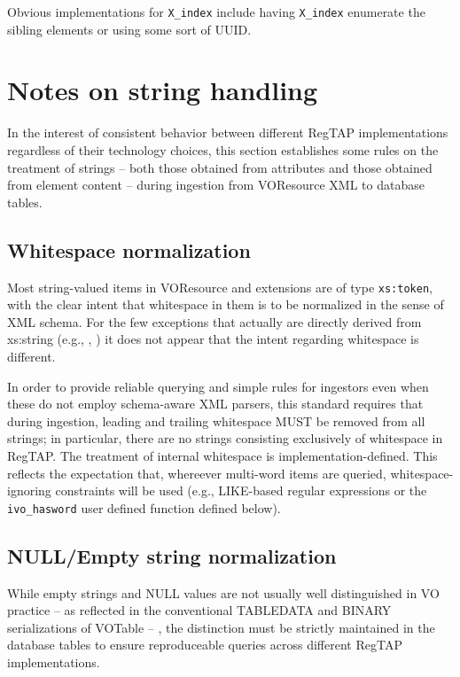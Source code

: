 \documentclass[11pt,a4paper]{ivoa}
\newcommand{\rtent}[1]{\texttt{\color{rtcolor} #1}}
\begin{document}
Obvious implementations for \texttt{X\_index} include having
\texttt{X\_index} enumerate the sibling elements or using some sort
of UUID.


\section{Notes on string handling}

\label{stringnorm}

In the interest of consistent behavior between different RegTAP
implementations regardless of their technology choices, this section
establishes some rules on the treatment of strings -- both those
obtained from attributes and those obtained from element
content -- during ingestion from VOResource XML to database
tables.



\subsection{Whitespace normalization}

\label{whitenorm}

Most string-valued items in VOResource and extensions are of type
\texttt{xs:to\-ken}, with the clear intent that whitespace in them is
to be normalized in the sense of XML schema.  For the few exceptions
that actually are directly derived from xs:string (e.g.,
, ) it does not
appear that the intent regarding whitespace is different.

In order to provide reliable querying and simple rules for ingestors
even when these do not employ schema-aware XML parsers, this standard
requires that during ingestion, leading and trailing whitespace MUST be
removed from all strings; in particular, there are no strings consisting
exclusively of whitespace in RegTAP.  The treatment of internal
whitespace is implementation-defined. This reflects the expectation
that, whereever multi-word items are queried, whitespace-ignoring
constraints will be used (e.g., LIKE-based regular expressions or the
\rtent{ivo\_hasword} user defined function defined below).


\subsection{NULL/Empty string normalization}

\label{nullnorm}

While empty strings and NULL values are not usually well
distinguished in VO practice -- as reflected in the conventional
TABLEDATA and BINARY serializations of VOTable -- , the distinction
must be strictly maintained in the database tables to ensure
reproduceable queries across different RegTAP implementations.
\end{document}

